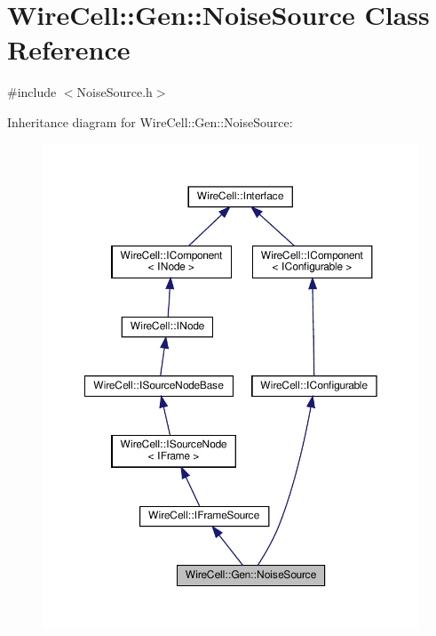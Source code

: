 \hypertarget{class_wire_cell_1_1_gen_1_1_noise_source}{}\section{Wire\+Cell\+:\+:Gen\+:\+:Noise\+Source Class Reference}
\label{class_wire_cell_1_1_gen_1_1_noise_source}


{\ttfamily \#include $<$Noise\+Source.\+h$>$}



Inheritance diagram for Wire\+Cell\+:\+:Gen\+:\+:Noise\+Source\+:
\nopagebreak
\begin{figure}[H]
\begin{center}
\leavevmode
\includegraphics[width=350pt]{class_wire_cell_1_1_gen_1_1_noise_source__inherit__graph}
\end{center}
\end{figure}



